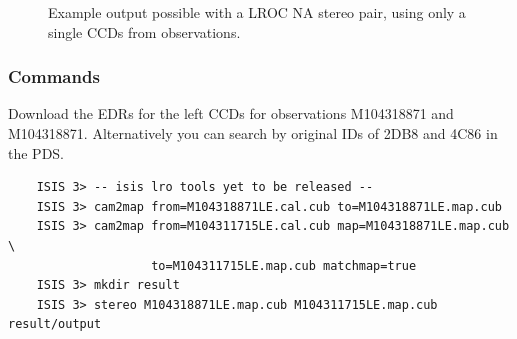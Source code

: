 \begin{figure}[h!]
\centering
  \hfil
\caption{Example output possible with a LROC NA stereo pair, using only a single CCDs from observations.}
\label{fig:lroc-na-example}
\end{figure}

\subsubsection*{Commands}

Download the EDRs for the left CCDs for observations M104318871 and
M104318871. Alternatively you can search by original IDs of 2DB8 and
4C86 in the PDS.

\begin{verbatim}
    ISIS 3> -- isis lro tools yet to be released --
    ISIS 3> cam2map from=M104318871LE.cal.cub to=M104318871LE.map.cub
    ISIS 3> cam2map from=M104311715LE.cal.cub map=M104318871LE.map.cub \
                    to=M104311715LE.map.cub matchmap=true
    ISIS 3> mkdir result
    ISIS 3> stereo M104318871LE.map.cub M104311715LE.map.cub result/output
\end{verbatim}

